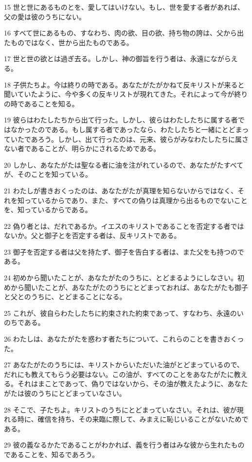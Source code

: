 \par 15 世と世にあるものとを、愛してはいけない。もし、世を愛する者があれば、父の愛は彼のうちにない。
\par 16 すべて世にあるもの、すなわち、肉の欲、目の欲、持ち物の誇は、父から出たものではなく、世から出たものである。
\par 17 世と世の欲とは過ぎ去る。しかし、神の御旨を行う者は、永遠にながらえる。
\par 18 子供たちよ。今は終りの時である。あなたがたがかねて反キリストが来ると聞いていたように、今や多くの反キリストが現れてきた。それによって今が終りの時であることを知る。
\par 19 彼らはわたしたちから出て行った。しかし、彼らはわたしたちに属する者ではなかったのである。もし属する者であったなら、わたしたちと一緒にとどまっていたであろう。しかし、出て行ったのは、元来、彼らがみなわたしたちに属さない者であることが、明らかにされるためである。
\par 20 しかし、あなたがたは聖なる者に油を注がれているので、あなたがたすべてが、そのことを知っている。
\par 21 わたしが書きおくったのは、あなたがたが真理を知らないからではなく、それを知っているからであり、また、すべての偽りは真理から出るものでないことを、知っているからである。
\par 22 偽り者とは、だれであるか。イエスのキリストであることを否定する者ではないか。父と御子とを否定する者は、反キリストである。
\par 23 御子を否定する者は父を持たず、御子を告白する者は、また父をも持つのである。
\par 24 初めから聞いたことが、あなたがたのうちに、とどまるようにしなさい。初めから聞いたことが、あなたがたのうちにとどまっておれば、あなたがたも御子と父とのうちに、とどまることになる。
\par 25 これが、彼自らわたしたちに約束された約束であって、すなわち、永遠のいのちである。
\par 26 わたしは、あなたがたを惑わす者たちについて、これらのことを書きおくった。
\par 27 あなたがたのうちには、キリストからいただいた油がとどまっているので、だれにも教えてもらう必要はない。この油が、すべてのことをあなたがたに教える。それはまことであって、偽りではないから、その油が教えたように、あなたがたは彼のうちにとどまっていなさい。
\par 28 そこで、子たちよ。キリストのうちにとどまっていなさい。それは、彼が現れる時に、確信を持ち、その来臨に際して、みまえに恥じいることがないためである。
\par 29 彼の義なるかたであることがわかれば、義を行う者はみな彼から生れたものであることを、知るであろう。

